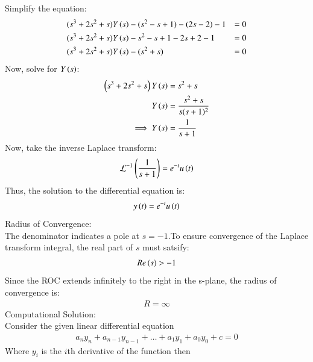 \documentclass[journal]{IEEEtran}
\begin{document}
Simplify the equation:
\begin{align}
&(s^3 + 2s^2 + s) Y\left(s\right) - (s^2 - s + 1) - (2s - 2) - 1 &= 0 \\
&(s^3 + 2s^2 + s) Y\left(s\right) - s^2 - s + 1 - 2s + 2 - 1 &= 0 \\
&(s^3 + 2s^2 + s) Y\left(s\right) - (s^2 + s) &= 0
\end{align}
Now, solve for \( Y\left(s\right) \):
\begin{align}
\left(s^3 + 2s^2 + s\right) Y\left(s\right) &= s^2 + s \\
Y\left(s\right) &= \frac{s^2 + s}{s(s+1)^2}\\
\implies Y\left(s\right) &= \frac{1}{s + 1}
\end{align}
Now, take the inverse Laplace transform:
\begin{align}
\mathcal{L}^{-1}\left(\frac{1}{s + 1}\right) = e^{-t}u\left(t\right)
\end{align}
Thus, the solution to the differential equation is:
\begin{align}
   y\left(t\right) = e^{-t}u\left(t\right)
\end{align}
\newline
Radius of Convergence:\\
The denominator indicates a pole at $s=-1$.To ensure convergence of the Laplace transform integral, the real part of $s$ must satsify:
\begin{align}
    Re\left(s\right)>-1
\end{align}
Since the ROC extends infinitely to the right in the s-plane, the radius of convergence is:
\begin{align}
    R=\infty
\end{align}
Computational Solution:\\
Consider the given linear differential equation
\begin{align}
	a_{n}y_{n} + a_{n-1}y_{n-1} + \dots + a_{1}y_1 + a_{0}y_{0} + c = 0
\end{align}
Where $y_{i}$ is the $i$th derivative of the function then
\end{document}
